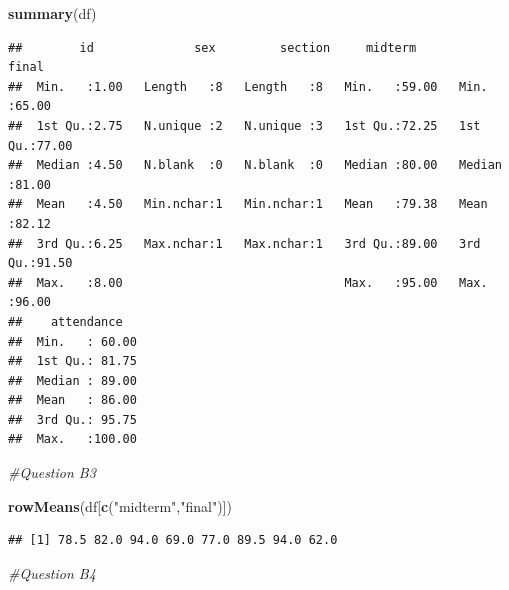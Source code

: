 \documentclass[
]{article}
\newenvironment{Shaded}{\begin{snugshade}}{\end{snugshade}}
\newcommand{\CommentTok}[1]{\textcolor[rgb]{0.56,0.35,0.01}{\textit{#1}}}
\newcommand{\FunctionTok}[1]{\textcolor[rgb]{0.13,0.29,0.53}{\textbf{#1}}}
\newcommand{\NormalTok}[1]{#1}
\newcommand{\StringTok}[1]{\textcolor[rgb]{0.31,0.60,0.02}{#1}}
\begin{document}
\begin{Shaded}
\begin{Highlighting}[]
\FunctionTok{summary}\NormalTok{(df)}
\end{Highlighting}
\end{Shaded}

\begin{verbatim}
##        id              sex         section     midterm          final      
##  Min.   :1.00   Length   :8   Length   :8   Min.   :59.00   Min.   :65.00  
##  1st Qu.:2.75   N.unique :2   N.unique :3   1st Qu.:72.25   1st Qu.:77.00  
##  Median :4.50   N.blank  :0   N.blank  :0   Median :80.00   Median :81.00  
##  Mean   :4.50   Min.nchar:1   Min.nchar:1   Mean   :79.38   Mean   :82.12  
##  3rd Qu.:6.25   Max.nchar:1   Max.nchar:1   3rd Qu.:89.00   3rd Qu.:91.50  
##  Max.   :8.00                               Max.   :95.00   Max.   :96.00  
##    attendance    
##  Min.   : 60.00  
##  1st Qu.: 81.75  
##  Median : 89.00  
##  Mean   : 86.00  
##  3rd Qu.: 95.75  
##  Max.   :100.00
\end{verbatim}

\begin{Shaded}
\begin{Highlighting}[]
\CommentTok{\#Question B3}

\FunctionTok{rowMeans}\NormalTok{(df[}\FunctionTok{c}\NormalTok{(}\StringTok{"midterm"}\NormalTok{,}\StringTok{"final"}\NormalTok{)])}
\end{Highlighting}
\end{Shaded}

\begin{verbatim}
## [1] 78.5 82.0 94.0 69.0 77.0 89.5 94.0 62.0
\end{verbatim}

\begin{Shaded}
\begin{Highlighting}[]
\CommentTok{\#Question B4}
\end{Highlighting}
\end{Shaded}
\end{document}

